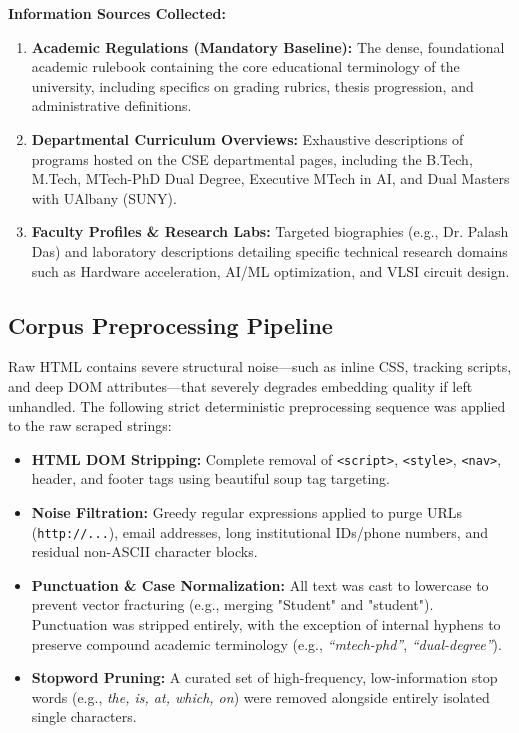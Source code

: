 \documentclass[11pt,a4paper]{article}
\begin{document}
\textbf{Information Sources Collected:}
\begin{enumerate}[label=\textbf{\textcolor{iitjblue}{\arabic*.}}, itemsep=0.5em]
    \justifying
    \item \textbf{Academic Regulations (Mandatory Baseline):} The dense, foundational academic rulebook containing the core educational terminology of the university, including specifics on grading rubrics, thesis progression, and administrative definitions.
    \item \textbf{Departmental Curriculum Overviews:} Exhaustive descriptions of programs hosted on the CSE departmental pages, including the B.Tech, M.Tech, MTech-PhD Dual Degree, Executive MTech in AI, and Dual Masters with UAlbany (SUNY).
    \item \textbf{Faculty Profiles \& Research Labs:} Targeted biographies (e.g., Dr. Palash Das) and laboratory descriptions detailing specific technical research domains such as Hardware acceleration, AI/ML optimization, and VLSI circuit design.
\end{enumerate}

\subsection{Corpus Preprocessing Pipeline}
Raw HTML contains severe structural noise—such as inline CSS, tracking scripts, and deep DOM attributes—that severely degrades embedding quality if left unhandled. The following strict deterministic preprocessing sequence was applied to the raw scraped strings:

\begin{itemize}[label=\textcolor{iitjgold}{\textbullet}, itemsep=0.5em]
    \justifying
    \item \textbf{HTML DOM Stripping:} Complete removal of \texttt{<script>}, \texttt{<style>}, \texttt{<nav>}, header, and footer tags using beautiful soup tag targeting.
    \item \textbf{Noise Filtration:} Greedy regular expressions applied to purge URLs (\texttt{http://...}), email addresses, long institutional IDs/phone numbers, and residual non-ASCII character blocks.
    \item \textbf{Punctuation \& Case Normalization:} All text was cast to lowercase to prevent vector fracturing (e.g., merging "Student" and "student"). Punctuation was stripped entirely, with the exception of internal hyphens to preserve compound academic terminology (e.g., \textit{``mtech-phd''}, \textit{``dual-degree''}).
    \item \textbf{Stopword Pruning:} A curated set of high-frequency, low-information stop words (e.g., \textit{the, is, at, which, on}) were removed alongside entirely isolated single characters.
\end{itemize}
\end{document}
